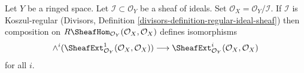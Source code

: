 \begin{lemma}
\label{lemma-regular-ideal-ext}
Let $Y$ be a ringed space. Let $\mathcal{I} \subset \mathcal{O}_Y$
be a sheaf of ideals. Set $\mathcal{O}_X = \mathcal{O}_Y/\mathcal{I}$.
If $\mathcal{I}$ is Koszul-regular
(Divisors, Definition \ref{divisors-definition-regular-ideal-sheaf})
then composition on $R\SheafHom_{\mathcal{O}_Y}(\mathcal{O}_X, \mathcal{O}_X)$
defines isomorphisms
$$
\wedge^i(\SheafExt^1_{\mathcal{O}_Y}(\mathcal{O}_X, \mathcal{O}_X))
\longrightarrow
\SheafExt^i_{\mathcal{O}_Y}(\mathcal{O}_X, \mathcal{O}_X)
$$
for all $i$.
\end{lemma}